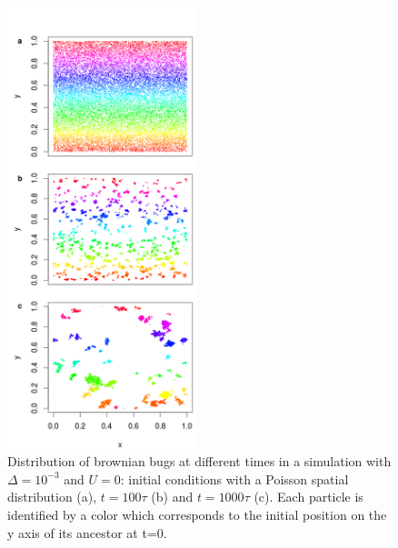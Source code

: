 \begin{figure}[H]
\begin{center} 
 \includegraphics[width=0.49\textwidth]{../code/figure/spatial_distribution_Fig1.png}
  \caption{Distribution of brownian bugs at different times in a simulation with $\Delta=10^{-3}$ and $U=0$: initial conditions with a Poisson spatial distribution (a), $t=100\tau$ (b) and $t=1000\tau$ (c). Each particle is identified by a color which corresponds to the initial position on the y axis of its ancestor at t=0.}
  \label{fig:spatial_fig1}
\end{center}
  \end{figure}

